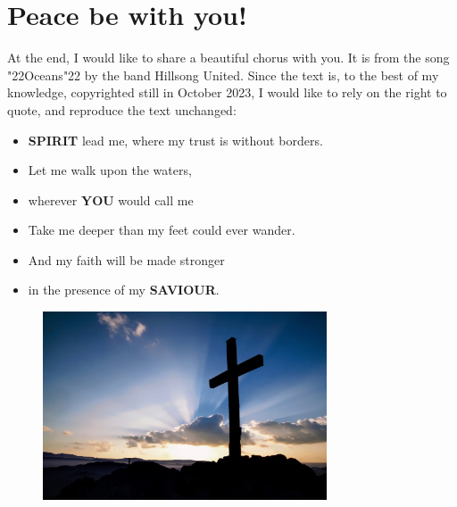 \documentclass[10pt,a5paper]{article}
\newcommand{\Saviour}[0]{\textbf{SAVIOUR}}
\newcommand{\Spirit}[0]{\textbf{SPIRIT}}
\newcommand{\You}[0]{\textbf{YOU}}
\newcommand{\q}[1]{\char"22{#1}\char"22 }
\begin{document}
	\section{Peace be with you!}
		At the end,
		I would like to share a beautiful chorus with you.
		It is from the song \q{Oceans} by the band Hillsong United.
		Since the text is,
		to the best of my knowledge,
		copyrighted still in October 2023,
		I would like to rely on the right to quote,
		and reproduce the text unchanged:
		\\	
		\begin{itemize}[nosep]
			\item[]	{\Spirit} lead me,
			where my trust is without borders.
			\item[] Let me walk upon the waters,
			\item[] wherever {\You} would call me
			\item[]	Take me deeper than my feet could ever wander.
			\item[]	And my faith will be made stronger
			\item[]	in the presence of my {\Saviour}.
			\\
		\end{itemize}
		\begin{figure}[h]
			\centering
			\includegraphics[width=0.75\textwidth,keepaspectratio]{"FreeChristian.jpeg"}
		\end{figure}
	
\end{document}
